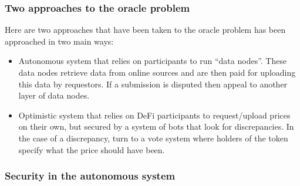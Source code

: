 \documentclass[10pt]{beamer}
\begin{document}
  \begin{frame} \frametitle{Two approaches to the oracle problem}

    Here are two approaches that have been taken to the oracle problem has been approached in two main ways:

    \begin{itemize}
      \item Autonomous system that relies on participants to run ``data nodes''. These data nodes
            retrieve data from online sources and are then paid for uploading this data by
            requestors. If a submission is disputed then appeal to another layer of data nodes.
      \item Optimistic system that relies on DeFi participants to request/upload prices on their
            own, but secured by a system of bots that look for discrepancies. In the case of a
            discrepancy, turn to a vote system where holders of the token specify what the price
            should have been.
    \end{itemize}

  \end{frame}

  \begin{frame} \frametitle{Security in the autonomous system}



  \end{frame}
\end{document}
